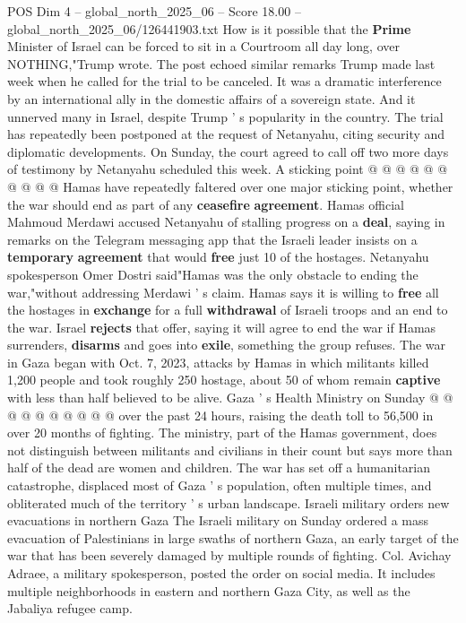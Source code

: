 \begin{textsample}{POS Dim 4 – global\_north\_2025\_06 – Score 18.00 – global\_north\_2025\_06/126441903.txt}
How is it possible that the \textbf{Prime} Minister of Israel can be forced to sit in a Courtroom all day long, over NOTHING,"Trump wrote.
The post echoed similar remarks Trump made last week when he called for the trial to be canceled.
It was a dramatic interference by an international ally in the domestic affairs of a sovereign state.
And it unnerved many in Israel, despite Trump ' s popularity in the country.
The trial has repeatedly been postponed at the request of Netanyahu, citing security and diplomatic developments.
On Sunday, the court agreed to call off two more days of testimony by Netanyahu scheduled this week.
A sticking point @ @ @ @ @ @ @ @ @ @ Hamas have repeatedly faltered over one major sticking point, whether the war should end as part of any \textbf{ceasefire} \textbf{agreement}.
Hamas official Mahmoud Merdawi accused Netanyahu of stalling progress on a \textbf{deal}, saying in remarks on the Telegram messaging app that the Israeli leader insists on a \textbf{temporary} \textbf{agreement} that would \textbf{free} just 10 of the hostages.
Netanyahu spokesperson Omer Dostri said"Hamas was the only obstacle to ending the war,"without addressing Merdawi ' s claim.
Hamas says it is willing to \textbf{free} all the hostages in \textbf{exchange} for a full \textbf{withdrawal} of Israeli troops and an end to the war.
Israel \textbf{rejects} that offer, saying it will agree to end the war if Hamas surrenders, \textbf{disarms} and goes into \textbf{exile}, something the group refuses.
The war in Gaza began with Oct. 7, 2023, attacks by Hamas in which militants killed 1,200 people and took roughly 250 hostage, about 50 of whom remain \textbf{captive} with less than half believed to be alive.
Gaza ' s Health Ministry on Sunday @ @ @ @ @ @ @ @ @ @ over the past 24 hours, raising the death toll to 56,500 in over 20 months of fighting.
The ministry, part of the Hamas government, does not distinguish between militants and civilians in their count but says more than half of the dead are women and children.
The war has set off a humanitarian catastrophe, displaced most of Gaza ' s population, often multiple times, and obliterated much of the territory ' s urban landscape.
Israeli military orders new evacuations in northern Gaza The Israeli military on Sunday ordered a mass evacuation of Palestinians in large swaths of northern Gaza, an early target of the war that has been severely damaged by multiple rounds of fighting.
Col.
Avichay Adraee, a military spokesperson, posted the order on social media.
It includes multiple neighborhoods in eastern and northern Gaza City, as well as the Jabaliya refugee camp.

\end{textsample}
